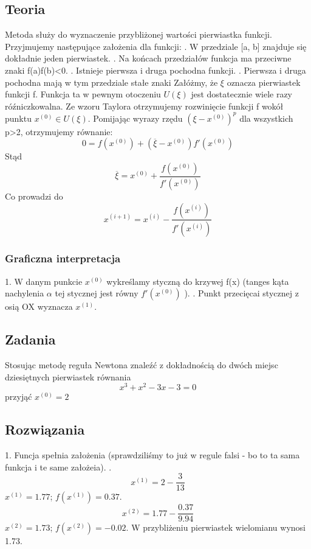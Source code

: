 \documentclass[a4paper]{article}
\begin{document}
\subsection{Teoria}
Metoda służy do wyznaczenie przybliżonej wartości pierwiastka funkcji. \newline
Przyjmujemy następujące założenia dla funkcji: . W przedziale [a, b] znajduje się dokładnie jeden pierwiastek. . Na końcach przedziałów funkcja ma przeciwne znaki f(a)f(b)<0. . Istnieje pierwsza i druga pochodna funkcji. . Pierwsza i druga pochodna mają w tym przedziale stałe znaki \newline
\newline
Załóżmy, że $\xi$ oznacza pierwiastek funkcji f. Funkcja ta w pewnym otoczeniu $U(\xi)$ jest dostatecznie wiele razy róźniczkowalna. Ze wzoru Taylora otrzymujemy rozwinięcie funkcji f wokół punktu $x^{(0)} \in U(\xi)$. Pomijając wyrazy rzędu $(\xi - x^{(0)})^p $ dla wszystkich p>2, otrzymujemy równanie:
$$ 0= f(x^{(0)}) + (\overline{\xi}-x^{(0)})f'(x^{(0)})$$ \newline
Stąd 
$$ \overline{\xi}= x^{(0)} + \frac{f(x^{(0)})}{f'(x^{(0)})}$$ \newline
Co prowadzi do 
$$ x^{(i+1)}= x^{(i)} - \frac{f(x^{(i)})}{f'(x^{(i)})}$$
\subsubsection*{Graficzna interpretacja}
1. W danym punkcie $x^{(0)}$ wykreślamy styczną do krzywej f(x) (tanges kąta nachylenia $\alpha$ tej stycznej jest równy $f'(x^{(0)})$ ). . Punkt przecięcai stycznej z osią OX wyznacza $x^{(1)}$.

\subsection{Zadania}
Stosując metodę reguła Newtona znaleźć z dokładnością do dwóch miejsc dziesiętnych pierwiastek równania
$$ x^3+x^2-3x-3=0$$
przyjąć $x^{(0)}=2$

\subsection{Rozwiązania}
1. Funcja spełnia założenia (sprawdziliśmy to już w regule falsi - bo to ta sama funkcja i te same założeia). . $$ x^{(1)}= 2 - \frac{3}{13}$$ \newline
$x^{(1)}= 1.77$; $f(x^{(1)})=0.37$. $$ x^{(2)}= 1.77 - \frac{0.37}{9.94}$$ 
$x^{(2)}=1.73$;  $f(x^{(2)})=-0.02$. W przybliżeniu pierwiastek wielomianu wynosi 1.73.
\end{document}

